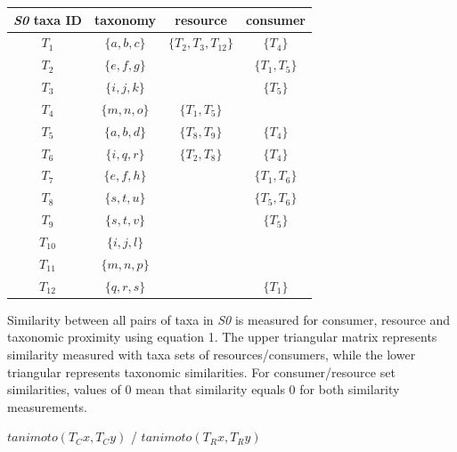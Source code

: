 \documentclass[letterpaper]{article}
\begin{document}
    \begin{table}[h!]
      \centering
      \begin{tabular}{cccc}
        \hline
        \textit{S0} taxa ID & taxonomy &          resource &             consumer        \\
        \hline
        \hline
        $T_1$ &         $\{a, b, c\}$ &     $\{T_2, T_3, T_{12}\}$ &    $\{T_4\}$         \\
        $T_2$ &         $\{e, f, g\}$ &      &                          $\{T_1, T_5\}$    \\
        $T_3$ &         $\{i, j, k\}$ &      &                          $\{T_5\}$         \\
        $T_4$ &         $\{m, n, o\}$ &     $\{T_1, T_5\}$ &                              \\
        $T_5$ &         $\{a, b, d\}$ &     $\{T_8, T_9\}$ &            $\{T_4\}$         \\
        $T_6$ &         $\{i, q, r\}$ &     $\{T_2, T_8\}$ &            $\{T_4\}$         \\
        $T_7$ &         $\{e, f, h\}$ &      &                          $\{T_1, T_6\}$    \\
        $T_8$ &         $\{s, t, u\}$ &      &                          $\{T_5, T_6\}$    \\
        $T_9$ &         $\{s, t, v\}$ &      &                          $\{T_5\}$         \\
        $T_{10}$ &      $\{i, j, l\}$ &      &                                            \\
        $T_{11}$ &      $\{m, n, p\}$ &      &                                            \\
        $T_{12}$ &      $\{q, r, s\}$ &      &                          $\{T_1\}$         \\
        \hline
      \end{tabular}
    \end{table}

Similarity between all pairs of taxa in \textit{S0} is measured for consumer, resource and taxonomic proximity using equation 1. The upper triangular matrix represents similarity measured with taxa sets of resources/consumers, while the lower triangular represents taxonomic similarities. For consumer/resource set similarities, values of 0 mean that similarity equals 0 for both similarity measurements.
\bigskip

    \centerline{$tanimoto(T_Cx, T_Cy)$ / $tanimoto(T_Rx, T_Ry)$ }
\end{document}
